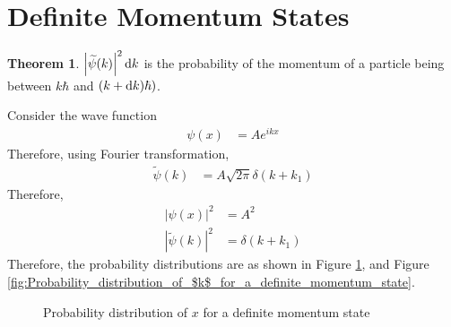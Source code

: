 \documentclass[titlepage, fleqn, a4paper, 12pt, twoside]{article}
\theoremstyle{definition}
\theoremstyle{theorem}
\newtheorem{theorem}{Theorem}
\let\Oldsection\section
\renewcommand{\section}{\FloatBarrier\Oldsection}
\renewcommand{\tilde}{\widetilde}
\begin{document}
\section{Definite Momentum States}

\begin{theorem}
	$\left| \tilde{\psi}(k) \right|^2 \dif k$ is the probability of the momentum of a particle being between $k \hbar$ and $(k + \dif k) \hbar)$.
\end{theorem}

Consider the wave function
\begin{align*}
	\psi(x) &= A e^{i k x}
\end{align*}
Therefore, using Fourier transformation,
\begin{align*}
	\tilde{\psi}(k) &= A \sqrt{2 \pi} \delta(k + k_1)
\end{align*}
Therefore,
\begin{align*}
	\left| \psi(x) \right|^2 &= A^2\\
	\left| \tilde{\psi}(k) \right|^2 &= \delta(k + k_1)
\end{align*}
Therefore, the probability distributions are as shown in Figure \ref{fig:Probability_distribution_of_$x$_for_a_definite_momentum_state}, and Figure \ref{fig:Probability_distribution_of_$k$_for_a_definite_momentum_state}.

\begin{figure}[h]
	\centering
	\caption{Probability distribution of $x$ for a definite momentum state}
	\label{fig:Probability_distribution_of_$x$_for_a_definite_momentum_state}
\end{figure}
\end{document}
